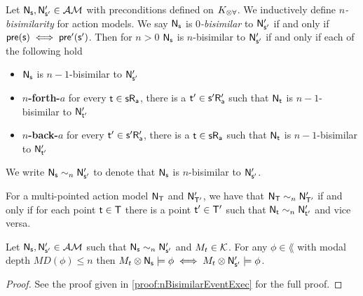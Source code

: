 \begin{defn} \label{nBisimEvent}
	Let $\aMod{\evMo_s, \evMo'_{s'}} \in \eventClass$ with preconditions defined on $\langArbAct$.
	We inductively define {\em $n$-bisimilarity} for action models.
	We say $\aMod{\evMo_s}$ is {\em $0$-bisimilar} to $\aMod{\evMo'_{s'}}$ if and only if $\aMod{pre(s) \iff
		pre'(s')}$.
	Then for $n > 0$ $\aMod{\evMo_s}$ is $n$-bisimilar to $\aMod{\evMo'_{s'}}$ if and only if each of the following hold
	\begin{itemize}
		\item $\aMod{\evMo_s}$ is $n-1$-bisimilar to $\aMod{\evMo'_{s'}}$
		\item {\bf $n$-forth-$a$} for every $\aMod{t \in s R_a}$, there is a $\aMod{t' \in s' R'_a}$
		such that $\aMod{\evMo_t}$ is
		$n-1$-bisimilar to $\aMod{\evMo'_{t'}}$
		\item {\bf $n$-back-$a$} for every $\aMod{t' \in s' R'_a}$, there is a $\aMod{t \in s R_a}$ such
		that $\aMod{\evMo_t}$ is
		$n-1$-bisimilar to $\aMod{\evMo'_{t'}}$
	\end{itemize}
	We write $\evMo_\evs \sim_n \evMo'_{\evs'}$ to denote that $\evMo_\evs$ is $n$-bisimilar to
	$\evMo'_{\evs'}$.
\end{defn}

For a multi-pointed action model $\aMod{\evMo_T}$ and $\aMod{\evMo'_{T'}}$, we have that $\evMo_\evT \sim_n
\evMo'_{\evT'}$ if and only if for each point $\evt \in \evT$ there is a point $\evt' \in \evT'$
such that $\evMo_\evt \sim_n \evMo'_{\evt'}$ and vice versa.

\begin{lemma} \label{nBisimilarEventExec}
	Let $\evMo_\evs, \evMo'_{\evs'} \in \eventClass$ such that $\evMo_\evs \sim_n \evM'_{\evs'}$ and
	$\krMo_t \in \kripkeClass$.
	For any $\phi \in \lang$ with modal depth $MD(\phi) \leq n$ then $\krMo_t \otimes \evMo_\evs \models \phi
	\iff \krMo_t \otimes \evMo'_{\evs'} \models \phi$.
\end{lemma}

\begin{proof}
	See the proof given in \ref{proof:nBisimilarEventExec} for the full proof.
\end{proof}

